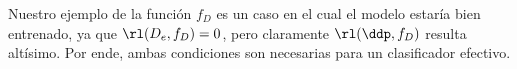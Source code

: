 Nuestro ejemplo de la función $f_D$ es un caso en el cual el modelo estaría bien entrenado, ya que $\rl(D_e,f_D)=0$, pero claramente $\rl(\ddp,f_D)$ resulta altísimo. Por ende, ambas condiciones son necesarias para un clasificador efectivo.

